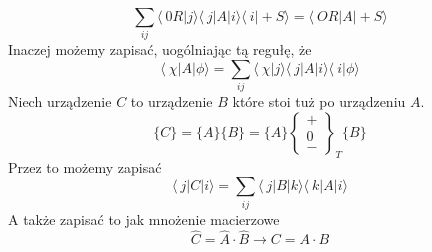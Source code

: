 \begin{equation*}
	\sum_{ij} \langle\ 0R \vert j \rangle \langle\ j \vert A \vert i \rangle \langle\ i \vert +S \rangle = \langle\ OR \vert A \vert +S \rangle
\end{equation*}
Inaczej możemy zapisać, uogólniając tą regułę, że 
\begin{equation*}
	\langle\ \chi \vert A \vert \phi \rangle = \sum_{ij} \langle\ \chi \vert j \rangle \langle\ j \vert A \vert i \rangle \langle\ i \vert \phi \rangle
\end{equation*}
Niech urządzenie $C$ to urządzenie $B$ które stoi tuż po urządzeniu $A$.
\begin{equation*}
	\{C\} = \{A\} \{B\} = \{A\} \left\{\begin{array}{lr}
		+ \\
		0 \\
		- 
	\end{array}\right\}_{T} \{B\}
\end{equation*}
Przez to możemy zapisać
\begin{equation*}
	\langle\ j \vert C \vert i \rangle = \sum_{ij} \langle\ j \vert B \vert k \rangle \langle\ k \vert A \vert i \rangle
\end{equation*}
A także zapisać to jak mnożenie macierzowe
\begin{equation*}
	\hat{C} = \hat{A} \cdot \hat{B} \rightarrow C = A \cdot B
\end{equation*}
